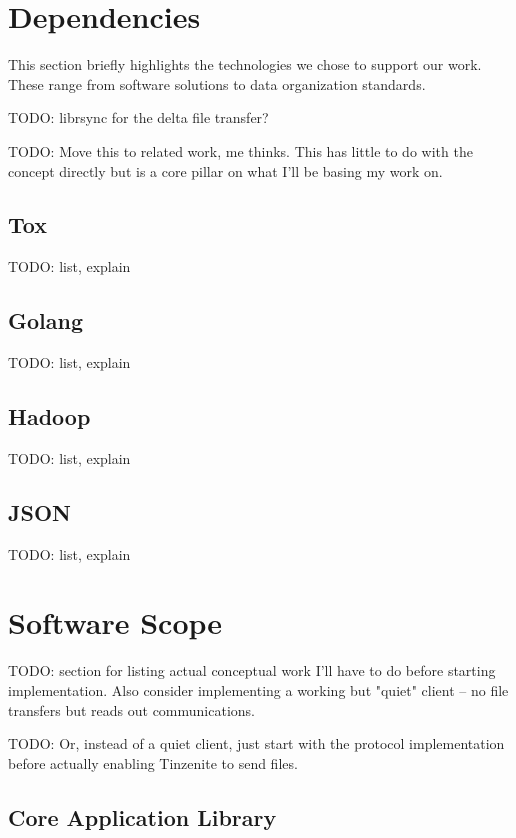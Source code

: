 \section{Dependencies}
\label{sec:Dependencies}

This section briefly highlights the technologies we chose to support our work.
These range from software solutions to data organization standards.

TODO: librsync for the delta file transfer?

TODO: Move this to related work, me thinks.
This has little to do with the concept directly but is a core pillar on what I'll be basing my work on.

\subsection{Tox}

TODO: list, explain

\subsection{Golang}

TODO: list, explain

\subsection{Hadoop}

TODO: list, explain

\subsection{JSON}

TODO: list, explain

\section{Software Scope}
\label{sec:Software Scope}

TODO: section for listing actual conceptual work I'll have to do before starting implementation.
Also consider implementing a working but "quiet" client – no file transfers but reads out communications.

TODO: Or, instead of a quiet client, just start with the protocol implementation before actually enabling Tinzenite to send files.

\subsection{Core Application Library}

